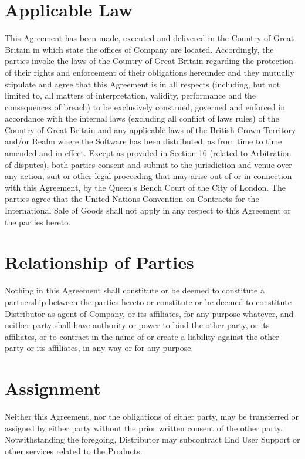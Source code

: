 \documentclass[letterpaper,10pt,english]{sphinxmanual}
\begin{document}
\section{Applicable Law}
\label{\detokenize{miscellaneous:applicable-law}}
This Agreement has been made, executed and delivered in the
Country of Great Britain in which state the offices of Company are located. Accordingly, the parties invoke the laws of the Country of Great Britain regarding the protection of their rights and enforcement of their obligations hereunder and they mutually stipulate and agree that this Agreement is in all respects (including, but not limited to, all matters of interpretation, validity, performance and the consequences of breach) to be exclusively construed, governed and enforced in accordance with the internal laws (excluding all conflict of laws rules) of the Country of Great Britain and any applicable laws of the British Crown Territory and/or Realm where the Software has been distributed, as from time to time amended and in effect. Except as provided in Section 16 (related to Arbitration of disputes), both parties consent and submit to the jurisdiction and venue over any action, suit or other legal proceeding that may arise out of or in connection with this Agreement, by the Queen’s Bench Court of the City of London. The parties agree that the United Nations Convention on Contracts for the International Sale of Goods shall not apply in any respect to this Agreement or the parties hereto.


\section{Relationship of Parties}
\label{\detokenize{miscellaneous:relationship-of-parties}}
Nothing in this Agreement shall constitute or be deemed to constitute a partnership between the parties hereto or constitute or be deemed to constitute Distributor as agent of Company, or its affiliates, for any purpose whatever, and neither party shall have  authority or power to bind the other party, or its affiliates, or to contract in the name of or create a liability against the other party or its affiliates, in any way or for any purpose.


\section{Assignment}
\label{\detokenize{miscellaneous:assignment}}
Neither this Agreement, nor the obligations of either party, may be transferred or assigned by either party without the prior written consent of the other party.  Notwithstanding the foregoing, Distributor may subcontract End User Support or other services related to the Products.
\end{document}
